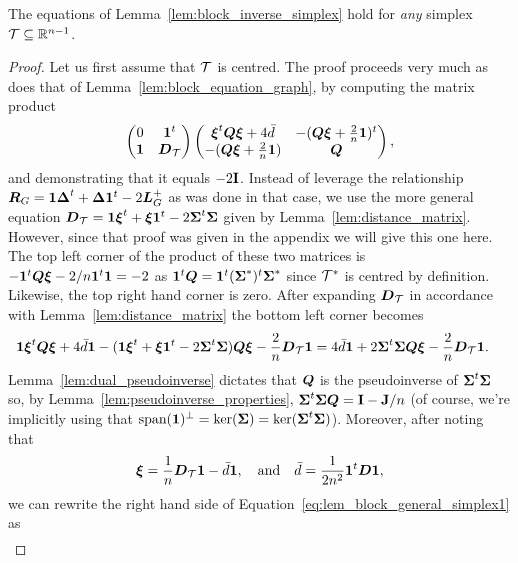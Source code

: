 \begin{lemma}
	\label{lem:block_general_simplex}
	The equations of Lemma~\ref{lem:block_inverse_simplex} hold for \emph{any} simplex $\mathcal{T}\subseteq\mathbb{R}^{n-1}$. 
\end{lemma}
\begin{proof}
	Let us first assume that $\mathcal{T}$ is centred. 
	The proof proceeds very much as  does  that of Lemma~\ref{lem:block_equation_graph}, by computing the matrix product  
	\[\begin{pmatrix}
	0 & \vb{1}^t \\
	\vb{1} & \vb*{D}_{\mathcal{T}}
	\end{pmatrix} \begin{pmatrix}
	\vb*{\xi}^t\vb*{Q}\vb*{\xi} + 4\bar{d}  &  -(\vb*{Q}\vb*{\xi}  + \frac{2}{n}\vb{1})^t  \\
	-(\vb*{Q}\vb*{\xi}  + \frac{2}{n}\vb{1}) &  \vb*{Q}
	\end{pmatrix},\] and demonstrating that it equals $-2\vb{I}$. Instead of leverage  the relationship $\vb*{R}_G=\vb{1}\vb*{\Delta}^t+\vb*{\Delta}\vb{1}^t - 2\vb*{L}_G^+$ as was done  in that case, we use the more general equation $\vb*{D}_{\mathcal{T}} = \vb{1}\vb*{\xi}^t+\vb*{\xi}\vb{1}^t - 2\boldsymbol{\Sigma}^t\boldsymbol{\Sigma}$ given by Lemma~\ref{lem:distance_matrix}. However, since that proof  was given  in the appendix we will give this one here.  The top left corner of  the product of these two matrices is $-\vb{1}^t\vb*{Q}\vb*{\xi}-2/n \vb{1}^t\vb{1} = -2$ as $\vb{1}^t\vb*{Q} = \vb{1}^t(\boldsymbol{\Sigma}^*)^t\boldsymbol{\Sigma}^*$ since $\mathcal{T}^*$ is centred by definition. Likewise,  the top right  hand corner is zero.  After expanding $\vb*{D}_{\mathcal{T}}$  in accordance with Lemma~\ref{lem:distance_matrix} the bottom left  corner becomes 
	\begin{align}
	&\vb{1}\vb*{\xi}^t\vb*{Q}\vb*{\xi}+4\bar{d}\vb{1} - (\vb{1}\vb*{\xi}^t+\vb*{\xi}\vb{1}^t - 2\boldsymbol{\Sigma}^t\boldsymbol{\Sigma})\vb*{Q}\vb*{\xi} -\frac{2}{n}\vb*{D}_{\mathcal{T}}\vb{1} = 4\bar{d}\vb{1} + 2\boldsymbol{\Sigma}^t\boldsymbol{\Sigma}\vb*{Q}\vb*{\xi}  -\frac{2}{n}\vb*{D}_{\mathcal{T}}\vb{1}. \label{eq:lem_block_general_simplex1}
	\end{align}
	Lemma~\ref{lem:dual_pseudoinverse} dictates that $\vb*{Q}$ is the pseudoinverse of $\boldsymbol{\Sigma}^t\boldsymbol{\Sigma}$ so, by Lemma~\ref{lem:pseudoinverse_properties}, $\boldsymbol{\Sigma}^t\boldsymbol{\Sigma}\vb*{Q}=\vb{I}-\vb{J}/n$ (of course, we're implicitly using that $\textnormal{span}(\vb{1})^\perp = \ker(\boldsymbol{\Sigma})=\ker(\boldsymbol{\Sigma}^t\boldsymbol{\Sigma})$). 
	Moreover, after noting that 
	\begin{equation*}
	\vb*{\xi} = \frac{1}{n}\vb*{D}_{\mathcal{T}}\vb{1} -\bar{d}\vb{1},\quad \text{and}\quad  \bar{d} = \frac{1}{2n^2}\vb{1}^t\vb*{D}\vb{1},
	\end{equation*}
	we can  rewrite the right  hand side of Equation~\eqref{eq:lem_block_general_simplex1} as 
	\begin{align*}

\end{align*}
\end{proof}
